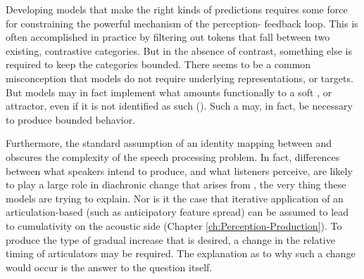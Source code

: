 Developing  models that make the right kinds of predictions
requires some force for constraining the powerful  mechanism
of the per\-cep\-tion- feedback loop. This is often accomplished
in practice by filtering out tokens that fall between two existing,
contrastive categories. But in the absence of contrast, something
else is required to keep the categories bounded. There seems to be
a common misconception that  models do not require underlying
representations, or targets. But models may in fact implement what
amounts functionally to a soft , or attractor, even if it is
not identified as such (). Such
a  may, in fact, be necessary to produce bounded behavior.

Furthermore, the standard assumption of an identity mapping between
 and  obscures the complexity of the speech processing
problem. In fact, differences between what speakers intend to produce,
and what listeners perceive, are likely to play a large role in diachronic
change that arises from , the very thing these
models are trying to explain. Nor is it the case that iterative application
of an articulation-based  (such as anticipatory feature spread)
can be assumed to lead to cumulativity on the acoustic side (Chapter
\ref{ch:Perception-Production}). To produce the type of gradual
increase that is desired, a change in the relative timing of articulators
may be required. The explanation as to why such a change would occur
is the answer to the  question itself.

